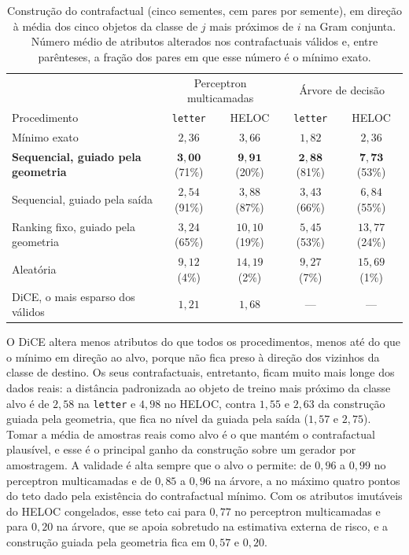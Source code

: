 \begin{table}[pos=htbp]
\centering
\caption{Construção do contrafactual (cinco sementes, cem pares por semente), em direção à média dos cinco objetos da classe de $j$ mais próximos de $i$ na Gram conjunta. Número médio de atributos alterados nos contrafactuais válidos e, entre parênteses, a fração dos pares em que esse número é o mínimo exato.}
\label{tab:res_contrafactual}
\footnotesize
\setlength{\tabcolsep}{3pt}
\begin{tabular}{l c c c c}
\hline
 & \multicolumn{2}{c}{Perceptron multicamadas} & \multicolumn{2}{c}{Árvore de decisão} \\
Procedimento & \texttt{letter} & HELOC & \texttt{letter} & HELOC \\
\hline
Mínimo exato & $2{,}36$ & $3{,}66$ & $1{,}82$ & $2{,}36$ \\
\textbf{Sequencial, guiado pela geometria} & $\mathbf{3{,}00}$ (71\%) & $\mathbf{9{,}91}$ (20\%) & $\mathbf{2{,}88}$ (81\%) & $\mathbf{7{,}73}$ (53\%) \\
Sequencial, guiado pela saída & $2{,}54$ (91\%) & $3{,}88$ (87\%) & $3{,}43$ (66\%) & $6{,}84$ (55\%) \\
Ranking fixo, guiado pela geometria & $3{,}24$ (65\%) & $10{,}10$ (19\%) & $5{,}45$ (53\%) & $13{,}77$ (24\%) \\
Aleatória & $9{,}12$ (4\%) & $14{,}19$ (2\%) & $9{,}27$ (7\%) & $15{,}69$ (1\%) \\
DiCE, o mais esparso dos válidos & $1{,}21$ & $1{,}68$ & --- & --- \\
\hline
\end{tabular}
\end{table}

O DiCE altera menos atributos do que todos os procedimentos, menos até do que o mínimo em direção ao alvo, porque não fica preso à direção dos vizinhos da classe de destino. Os seus contrafactuais, entretanto, ficam muito mais longe dos dados reais: a distância padronizada ao objeto de treino mais próximo da classe alvo é de $2{,}58$ na \texttt{letter} e $4{,}98$ no HELOC, contra $1{,}55$ e $2{,}63$ da construção guiada pela geometria, que fica no nível da guiada pela saída ($1{,}57$ e $2{,}75$). Tomar a média de amostras reais como alvo é o que mantém o contrafactual plausível, e esse é o principal ganho da construção sobre um gerador por amostragem. A validade é alta sempre que o alvo o permite: de $0{,}96$ a $0{,}99$ no perceptron multicamadas e de $0{,}85$ a $0{,}96$ na árvore, a no máximo quatro pontos do teto dado pela existência do contrafactual mínimo. Com os atributos imutáveis do HELOC congelados, esse teto cai para $0{,}77$ no perceptron multicamadas e para $0{,}20$ na árvore, que se apoia sobretudo na estimativa externa de risco, e a construção guiada pela geometria fica em $0{,}57$ e $0{,}20$.

